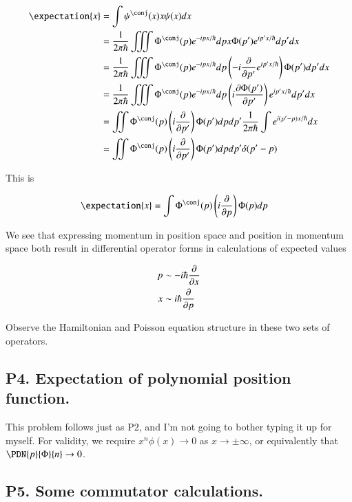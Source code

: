 \documentclass{article}
\begin{document}
\begin{align*}
\expectation{x} 
&= \int \psi^\conj(x) x \psi(x) dx \\
&= 
\inv{2\pi\hbar} \iiint \Phi^\conj(p) e^{-ipx/\hbar} dp x \Phi(p') e^{ip'x/\hbar} dp' dx \\
&= 
\inv{2\pi\hbar} \iiint \Phi^\conj(p) e^{-ipx/\hbar} dp \left( -i \PD{p'}{} e^{ip'x/\hbar} \right) \Phi(p') dp' dx \\
&= 
\inv{2\pi\hbar} \iiint \Phi^\conj(p) e^{-ipx/\hbar} dp \left( i \PD{p'}{\Phi(p')} \right) e^{ip'x/\hbar} dp' dx \\
&= 
\iint \Phi^\conj(p) \left( i \PD{p'}{} \right) {\Phi(p')} dp dp' \inv{2\pi\hbar} \int e^{i(p'-p)x/\hbar} dx  \\
&= 
\iint \Phi^\conj(p) \left( i \PD{p'}{} \right) {\Phi(p')} dp dp' \delta(p'-p)  \\
\end{align*}

This is

\begin{align*}
\expectation{x} &= \int \Phi^\conj(p) \left( i \PD{p}{} \right) {\Phi(p)} dp 
\end{align*}

We see that expressing momentum in position space and position in momentum space both result in differential
operator forms in calculations of expected values

\begin{align}\label{eqn:operatorCorrespondance}
p &\sim -i \hbar \frac{\partial {}}{\partial {x}} \\
x &\sim i \hbar \frac{\partial {}}{\partial {p}}
\end{align}

Observe the Hamiltonian and Poisson equation structure in these two sets of operators.

\subsection{P4. Expectation of polynomial position function. }

This problem follows just as P2, and I'm not going to bother typing it up for myself.  For validity, we require
$x^n \phi(x) \rightarrow 0$ as $x \rightarrow \pm \infty$, or equivalently that $\PDN{p}{\Phi}{n} \rightarrow 0$.

\subsection{P5. Some commutator calculations. }
\end{document}
